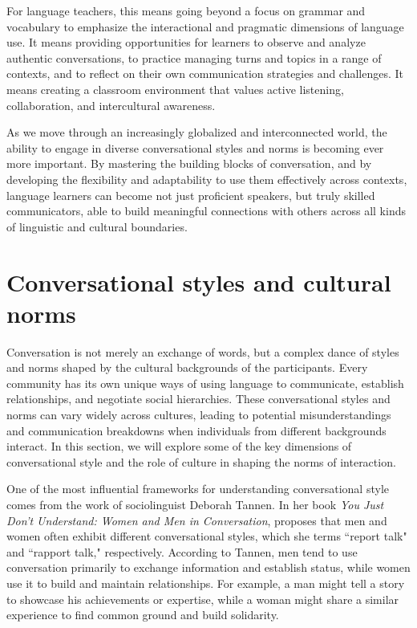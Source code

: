 For language teachers, this means going beyond a focus on grammar and vocabulary to emphasize the interactional and pragmatic dimensions of language use. It means providing opportunities for learners to observe and analyze authentic conversations, to practice managing turns and topics in a range of contexts, and to reflect on their own communication strategies and challenges. It means creating a classroom environment that values active listening, collaboration, and intercultural awareness.

As we move through an increasingly globalized and interconnected world, the ability to engage in diverse conversational styles and norms is becoming ever more important. By mastering the building blocks of conversation, and by developing the flexibility and adaptability to use them effectively across contexts, language learners can become not just proficient speakers, but truly skilled communicators, able to build meaningful connections with others across all kinds of linguistic and cultural boundaries.

\section{Conversational styles and cultural norms}

Conversation is not merely an exchange of words, but a complex dance of styles and norms shaped by the cultural backgrounds of the participants. Every community has its own unique ways of using language to communicate, establish relationships, and negotiate social hierarchies. These conversational styles and norms can vary widely across cultures, leading to potential misunderstandings and communication breakdowns when individuals from different backgrounds interact. In this section, we will explore some of the key dimensions of conversational style and the role of culture in shaping the norms of interaction.

One of the most influential frameworks for understanding conversational style comes from the work of sociolinguist Deborah Tannen. In her book \textit{You Just Don't Understand: Women and Men in Conversation}, \citet{Tannen1990} proposes that men and women often exhibit different conversational styles, which she terms ``report talk" and ``rapport talk," respectively. According to Tannen, men tend to use conversation primarily to exchange information and establish status, while women use it to build and maintain relationships. For example, a man might tell a story to showcase his achievements or expertise, while a woman might share a similar experience to find common ground and build solidarity.

